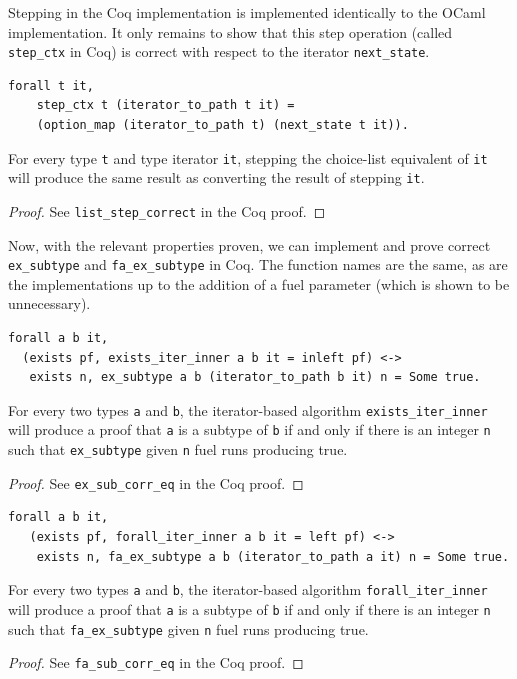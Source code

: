 \documentclass[a4paper,english]{lipics-v2018}
\begin{document}
Stepping in the Coq implementation is implemented identically to the OCaml
implementation. It only remains to show that this step operation (called
\verb|step_ctx| in Coq) is correct with respect to the iterator
\verb|next_state|.

\begin{lemma}
\begin{small}\begin{verbatim}
forall t it,
    step_ctx t (iterator_to_path t it) =
    (option_map (iterator_to_path t) (next_state t it)).
\end{verbatim}\end{small}
For every type \verb|t| and type iterator \verb|it|,
stepping the choice-list equivalent of \verb|it| will
produce the same result as converting the result of stepping
\verb|it|.
\end{lemma}
\begin{proof}
See \verb|list_step_correct| in the Coq proof.
\end{proof}

Now, with the relevant properties proven, we can implement and prove correct
\verb|ex_subtype| and \verb|fa_ex_subtype| in Coq. The function names are the
same, as are the implementations up to the addition of a fuel parameter (which
is shown to be unnecessary). 

\begin{lemma}
\begin{small}\begin{verbatim}
forall a b it, 
  (exists pf, exists_iter_inner a b it = inleft pf) <->
   exists n, ex_subtype a b (iterator_to_path b it) n = Some true.
\end{verbatim}\end{small}
For every two types \verb|a| and \verb|b|, the iterator-based algorithm
\verb|exists_iter_inner| will produce a proof that \verb|a| is a subtype
of \verb|b| if and only if there is an integer \verb|n| such that
 \verb|ex_subtype| given \verb|n| fuel runs producing true.
\end{lemma}
\begin{proof}
See \verb|ex_sub_corr_eq| in the Coq proof.
\end{proof}

\begin{lemma}
\begin{small}\begin{verbatim}
forall a b it,
   (exists pf, forall_iter_inner a b it = left pf) <->
    exists n, fa_ex_subtype a b (iterator_to_path a it) n = Some true.
\end{verbatim}
\end{small}  
For every two types \verb|a| and \verb|b|, the iterator-based algorithm
\verb|forall_iter_inner| will produce a proof that \verb|a| is a subtype
of \verb|b| if and only if there is an integer \verb|n| such that
 \verb|fa_ex_subtype| given \verb|n| fuel runs producing true.
\end{lemma}
\begin{proof}
See \verb|fa_sub_corr_eq| in the Coq proof.
\end{proof}
\end{document}
